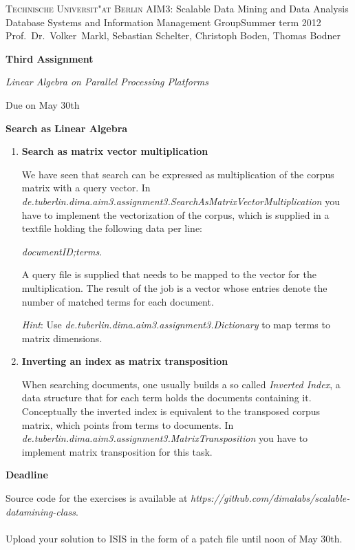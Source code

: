 \documentclass[11pt,a4paper]{article}
\begin{document}
\textsc{Technische Universit"at Berlin}{\small\hfill 
AIM3: Scalable Data Mining and Data Analysis}\\
{\small Database Systems and Information Management Group{\small\hfill Summer term 2012}\\
Prof.~Dr.~Volker~Markl, Sebastian Schelter, Christoph Boden, Thomas Bodner}

\bigskip
\centerline{\Large\textbf{Third Assignment}}
\centerline{\emph{Linear Algebra on Parallel Processing Platforms}}
\centerline{Due on May 30th}
\bigskip

\centerline{\textbf{Search as Linear Algebra}}
\bigskip

\begin{enumerate}
\item \textbf{Search as matrix vector multiplication}

We have seen that search can be expressed as multiplication of the corpus matrix with a query vector. In \textit{de.tuberlin.dima.aim3.assignment3.SearchAsMatrixVectorMultiplication} you have to implement the vectorization of the corpus,
which is supplied in a textfile holding the following data per line:

\textit{documentID;terms}.

A query file is supplied that needs to be mapped to the vector for the multiplication. The result of the job is a vector 
whose entries denote the number of matched terms for each document.

\textit{Hint}: Use \textit{de.tuberlin.dima.aim3.assignment3.Dictionary} to map terms to matrix dimensions.

\item \textbf{Inverting an index as matrix transposition}

When searching documents, one usually builds a so called \textit{Inverted Index}, a data structure that for each term holds the documents containing it.
Conceptually the inverted index is equivalent to the transposed corpus matrix, which points from terms to documents. In \textit{de.tuberlin.dima.aim3.assignment3.MatrixTransposition} you have to implement matrix transposition for this task.

\end{enumerate}

\bigskip
\centerline{\textbf{Deadline}}
\bigskip

Source code for the exercises is available at \textit{https://github.com/dimalabs/scalable-datamining-class}. 
\\
\\
Upload your solution to ISIS in the form of a patch file until noon of May 30th.
\end{document}
